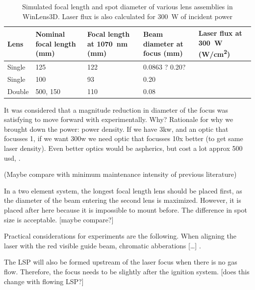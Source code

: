             \begin{table}[!ht]
                \centering
                \caption{Simulated focal length and spot diameter of various lens assemblies in WinLens3D. Laser flux is also calculated for \qty{300}{W} of incident power}
                \label{tab:laser flux}
                \begin{tabularx}{\textwidth}{@{}lX<{\raggedright}X<{\raggedright}X<{\raggedright}X<{\raggedright}@{}}
                \toprule
                Lens & Nominal focal length (\unit{mm}) & Focal length at \qty{1070}{nm} (\unit{mm})& Beam diameter at focus (\unit{mm}) & Laser flux at \qty{300}{W} (\unit{W/cm^2}) \\ \midrule
                Single & 125           &  122   &    0.0863 ?  0.20?     &  \\
                Single & 100           &  93   &    0.20   &  \\
                Double & 500, 150      &  110    &    0.08   &  \\
                \bottomrule
                \end{tabularx}
            \end{table}

            It was considered that a magnitude reduction in diameter of the focus was satisfying to move forward with experimentally. Why? Rationale for why we brought down the power: power density. If we have 3kw, and an optic that focusses 1, if we want 300w we need optic that focusses 10x better (to get same laser density). Even better optics would be aspherics, but cost a lot approx 500 usd, .

            (Maybe compare with minimum maintenance intensity of previous literature)

            In a two element system, the longest focal length lens should be placed first, as the diameter of the beam entering the second lens is maximized. However, it is placed after here because it is impossible to mount before. The difference in spot size is acceptable. [maybe compare?]

            Practical considerations for experiments are the following. When aligning the laser with the red visible guide beam, chromatic abberations [\dots] \cite{hechtUnderstandingLasersEntry2019}.

            The LSP will also be formed upstream of the laser focus when there is no gas flow. Therefore, the focus needs to be slightly after the ignition system. [does this change with flowing LSP?]

